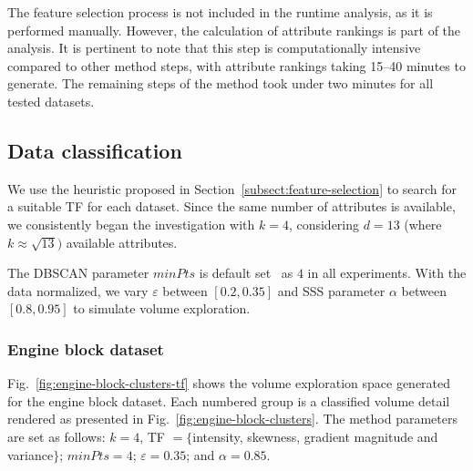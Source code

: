 The feature selection process is not included in the runtime analysis, as it is performed manually. However, the calculation of attribute rankings is part of the analysis. It is pertinent to note that this step is computationally intensive compared to other method steps, with attribute rankings taking 15--40 minutes to generate. The remaining steps of the method took under two minutes for all tested datasets.

\subsection{Data classification}
\label{subsect:material-classification}

We use the heuristic proposed in Section~\ref{subsect:feature-selection} to search for a suitable TF for each dataset. Since the same number of attributes is available, we consistently began the investigation with $k = 4$, considering $d=13$ (where $k\approx \sqrt{13})$ available attributes. 

The DBSCAN parameter $minPts$ is default set~\cite{ester1996} as $4$ in all experiments. With the data normalized, we vary $\varepsilon$ between $\left[ 0.2, 0.35\right]$ and SSS parameter $\alpha$  between $\left[0.8, 0.95\right]$ to simulate volume exploration.

\subsubsection{Engine block dataset}
\label{subsubsec:engine-block}

Fig.~\ref{fig:engine-block-clusters-tf} shows the volume exploration space generated for the engine block dataset. Each numbered group is a classified volume detail rendered as presented in Fig.~\ref{fig:engine-block-clusters}. The method parameters are set as follows: $k=4$, TF $=\{$intensity, skewness, gradient magnitude and variance$\}$; $minPts = 4$; $\varepsilon = 0.35$; and $\alpha = 0.85$. 

